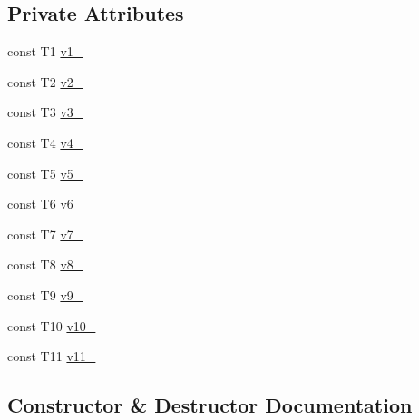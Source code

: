 \subsection*{Private Attributes}
\begin{DoxyCompactItemize}
\item 
const T1 \mbox{\hyperlink{classtesting_1_1internal_1_1_value_array11_a71073a0664a3702f415c198ab3ba75c8}{v1\+\_\+}}
\item 
const T2 \mbox{\hyperlink{classtesting_1_1internal_1_1_value_array11_a122b1952763e333d9838d9f421489683}{v2\+\_\+}}
\item 
const T3 \mbox{\hyperlink{classtesting_1_1internal_1_1_value_array11_a7b855c2c397a235f2261da7d9c31c2dd}{v3\+\_\+}}
\item 
const T4 \mbox{\hyperlink{classtesting_1_1internal_1_1_value_array11_aa17d6926f36bfa3525824dbe4eafd31f}{v4\+\_\+}}
\item 
const T5 \mbox{\hyperlink{classtesting_1_1internal_1_1_value_array11_a4d8f6379f4d25bbb42330efe4fd48860}{v5\+\_\+}}
\item 
const T6 \mbox{\hyperlink{classtesting_1_1internal_1_1_value_array11_ac1516573b1782065efb71be155ff6c92}{v6\+\_\+}}
\item 
const T7 \mbox{\hyperlink{classtesting_1_1internal_1_1_value_array11_a593e8bcb189864702b53e333838a4333}{v7\+\_\+}}
\item 
const T8 \mbox{\hyperlink{classtesting_1_1internal_1_1_value_array11_ab1a73adeaff7d93a6f48adaeff315063}{v8\+\_\+}}
\item 
const T9 \mbox{\hyperlink{classtesting_1_1internal_1_1_value_array11_a295a3a7d85364089d827ce6b86b08376}{v9\+\_\+}}
\item 
const T10 \mbox{\hyperlink{classtesting_1_1internal_1_1_value_array11_a2dadac5c3ff045d8892189165c9d5b28}{v10\+\_\+}}
\item 
const T11 \mbox{\hyperlink{classtesting_1_1internal_1_1_value_array11_a50e36170b4ecd9fcec26342c85c0b78c}{v11\+\_\+}}
\end{DoxyCompactItemize}


\subsection{Constructor \& Destructor Documentation}
\mbox{\label{classtesting_1_1internal_1_1_value_array11_a2b26f49e7c5856e86f4fae360cd22d47}} 
